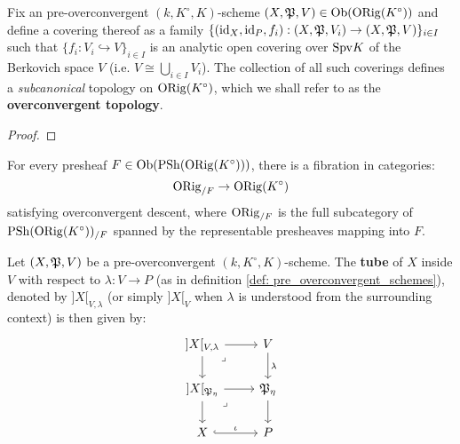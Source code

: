             \begin{proposition} \label{prop: the_overconvergent_topology}
                Fix an pre-overconvergent $(k, K^{\circ}, K)$-scheme $(X, \mathfrak{P}, V) \in \mathrm{Ob}(\mathrm{ORig}(K^{\circ}))$ and define a covering thereof as a family $\{(\mathrm{id}_X, \mathrm{id}_P, f_i): (X, \mathfrak{P}, V_i) \to (X, \mathfrak{P}, V)\}_{i \in I}$ such that $\{f_i: V_i \hookrightarrow V\}_{i \in I}$ is an analytic open covering over $\mathrm{Spv} K$ of the Berkovich space $V$ (i.e. $V \cong \bigcup_{i \in I} V_i$). The collection of all such coverings defines a \textit{subcanonical} topology on $\mathrm{ORig}(K^{\circ})$, which we shall refer to as the \textbf{overconvergent topology}.
            \end{proposition}
                \begin{proof}
                    
                \end{proof}
            \begin{corollary}
                For every presheaf $F \in \mathrm{Ob}(\mathrm{PSh}(\mathrm{ORig}(K^{\circ})))$, there is a fibration in categories:
                    $$\mathrm{ORig}_{/F} \to \mathrm{ORig}(K^{\circ})$$
                satisfying overconvergent descent, where $\mathrm{ORig}_{/F}$ is the full subcategory of $\mathrm{PSh}(\mathrm{ORig}(K^{\circ}))_{/F}$ spanned by the representable presheaves mapping into $F$.
            \end{corollary}
            \begin{definition}[Tubes] \label{def: berthelot_tubes}
                Let $(X, \mathfrak{P}, V)$ be a pre-overconvergent $(k, K^{\circ}, K)$-scheme. The \textbf{tube} of $X$ inside $V$ with respect to $\lambda: V \to P$ (as in definition \ref{def: pre_overconvergent_schemes}), denoted by $]X[_{V, \lambda}$ (or simply $]X[_V$ when $\lambda$ is understood from the surrounding context) is then given by:
                    $$
                        \begin{tikzcd}
                        	{]X[_{V, \lambda}} & V \\
                        	{]X[_{\frakP_{\eta}}} & {\frakP_{\eta}} \\
                        	X & P
                        	\arrow["\iota", hook, from=3-1, to=3-2]
                        	\arrow["\lambda", from=1-2, to=2-2]
                        	\arrow[from=2-2, to=3-2]
                        	\arrow[from=1-1, to=2-1]
                        	\arrow[from=2-1, to=3-1]
                        	\arrow[from=1-1, to=1-2]
                        	\arrow[from=2-1, to=2-2]
                        	\arrow["\lrcorner"{anchor=center, pos=0.125}, draw=none, from=2-1, to=3-2]
                        	\arrow["\lrcorner"{anchor=center, pos=0.125}, draw=none, from=1-1, to=2-2]
                        \end{tikzcd}
                    $$
            \end{definition}
